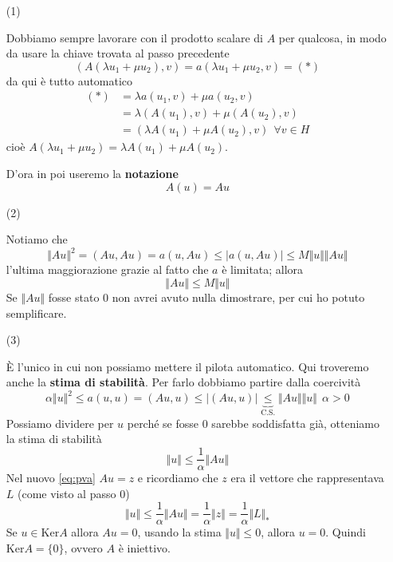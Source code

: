 \documentclass[10pt,a4paper,twoside,openright]{book}
\begin{document}
\begin{dimostrazione}
\begin{itemize}
		\item[(1)]

		Dobbiamo sempre lavorare con il prodotto scalare di $A$ per qualcosa, in modo da usare la chiave trovata al passo precedente
		\begin{equation*}
			( A( \lambda u_{1} +\mu u_{2}),v) =a( \lambda u_{1} +\mu u_{2},v) =(*)
		\end{equation*}
		da qui è tutto automatico
		\begin{align*}
			(*) & =\lambda a(u_{1},v) +\mu a(u_{2},v)\\
			    & =\lambda (A(u_{1}),v) +\mu (A(u_{2}),v)\\
			    & =(\lambda A(u_{1}) +\mu A(u_{2}),v) \ \ \forall v\in H
		\end{align*}
		cioè $A( \lambda u_{1} +\mu u_{2}) =\lambda A(u_{1}) +\mu A(u_{2})$.

		D'ora in poi useremo la \textbf{notazione}
		\begin{equation*}
			A(u) =Au
		\end{equation*}


		\item[(2)]

		Notiamo che
		\begin{equation*}
			\Vert Au\Vert ^{2} =(Au,Au) =a(u,Au) \leqslant | a(u,Au)| \leqslant M\Vert u\Vert \Vert Au\Vert 
		\end{equation*}
		l'ultima maggiorazione grazie al fatto che $a$ è limitata; allora
		\begin{equation*}
			\Vert Au\Vert \leqslant M\Vert u\Vert 
		\end{equation*}
		Se $\Vert Au\Vert $ fosse stato $0$ non avrei avuto nulla dimostrare, per cui ho potuto semplificare.



		\item[(3)]

		È l'unico in cui non possiamo mettere il pilota automatico. Qui troveremo anche la \textbf{stima di stabilità}. Per farlo dobbiamo partire dalla coercività
		\begin{equation*}
			\alpha \Vert u\Vert ^{2} \leqslant a(u,u) =(Au,u) \leqslant | (Au,u)| \underbrace{\leqslant }_{\text{C.S.}}\Vert Au\Vert \Vert u\Vert \ \ \alpha  >0
		\end{equation*}
		Possiamo dividere per $u$ perché se fosse $0$ sarebbe soddisfatta già, otteniamo la stima di stabilità
		\begin{equation*}
			\Vert u\Vert \leqslant \frac{1}{\alpha }\Vert Au\Vert 
		\end{equation*}
		Nel nuovo \eqref{eq:pva} $Au=z$ e ricordiamo che $z$ era il vettore che rappresentava $L$ (come visto al passo 0)
		\begin{equation*}
			\Vert u\Vert \leqslant \frac{1}{\alpha }\Vert Au\Vert =\frac{1}{\alpha }\Vert z\Vert =\frac{1}{\alpha }\Vert L\Vert _{*}
		\end{equation*}
		Se $u\in \mathrm{Ker} A$ allora $Au=0$, usando la stima $\Vert u\Vert \leqslant 0$, allora $u=0$. Quindi $\mathrm{Ker} A=\{0\}$, ovvero $A$ è iniettivo.




\end{itemize}
\end{dimostrazione}
\end{document}
